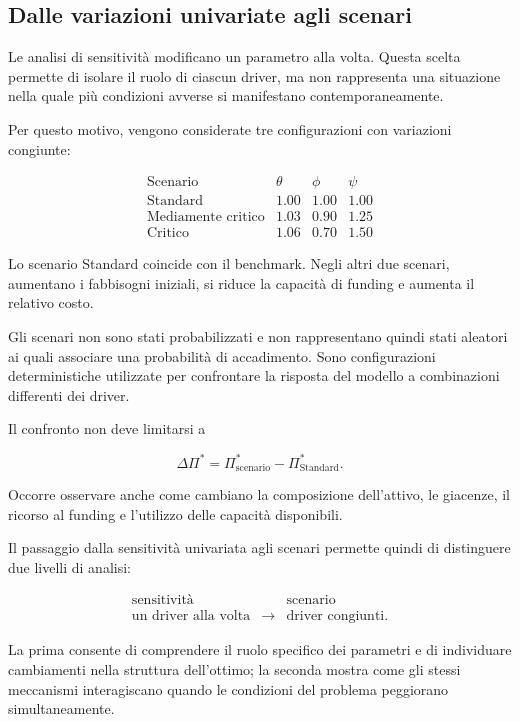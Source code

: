 \subsection{Dalle variazioni univariate agli scenari}

Le analisi di sensitivit\`a modificano un parametro alla volta. Questa scelta
permette di isolare il ruolo di ciascun driver, ma non rappresenta una
situazione nella quale pi\`u condizioni avverse si manifestano
contemporaneamente.

Per questo motivo, vengono considerate tre configurazioni con variazioni
congiunte:

\[
\begin{array}{c|ccc}
\text{Scenario}
&
\theta
&
\phi
&
\psi
\\ \hline
\text{Standard}
&
1.00
&
1.00
&
1.00
\\
\text{Mediamente critico}
&
1.03
&
0.90
&
1.25
\\
\text{Critico}
&
1.06
&
0.70
&
1.50
\end{array}
\]

Lo scenario Standard coincide con il benchmark. Negli altri due scenari,
aumentano i fabbisogni iniziali, si riduce la capacit\`a di funding e aumenta
il relativo costo.

Gli scenari non sono stati probabilizzati e non rappresentano quindi stati
aleatori ai quali associare una probabilit\`a di accadimento. Sono
configurazioni deterministiche utilizzate per confrontare la risposta del
modello a combinazioni differenti dei driver.

Il confronto non deve limitarsi a

\[
\Delta\Pi^*
=
\Pi^*_{\mathrm{scenario}}
-
\Pi^*_{\mathrm{Standard}}.
\]

Occorre osservare anche come cambiano la composizione dell'attivo, le
giacenze, il ricorso al funding e l'utilizzo delle capacit\`a disponibili.

Il passaggio dalla sensitivit\`a univariata agli scenari permette quindi di
distinguere due livelli di analisi:

\[
\begin{array}{ccc}
\text{sensitivit\`a}
&
&
\text{scenario}
\\[3pt]
\text{un driver alla volta}
&
\longrightarrow
&
\text{driver congiunti}.
\end{array}
\]

La prima consente di comprendere il ruolo specifico dei parametri e di
individuare cambiamenti nella struttura dell'ottimo; la seconda mostra come
gli stessi meccanismi interagiscano quando le condizioni del problema
peggiorano simultaneamente.

